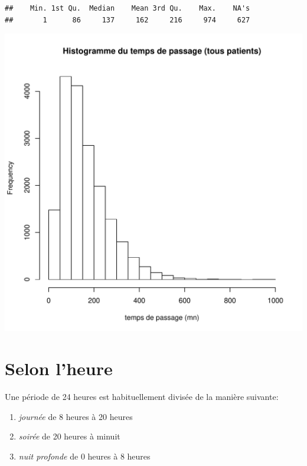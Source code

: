 \documentclass[12pt,english,french,twoside]{report}\usepackage[]{graphicx}\usepackage[]{color}
\makeatletter
\def\maxwidth{ %
  \ifdim\Gin@nat@width>\linewidth
    \linewidth
  \else
    \Gin@nat@width
  \fi
}
\newenvironment{kframe}{%
 \def\at@end@of@kframe{}%
 \ifinner\ifhmode%
  \def\at@end@of@kframe{\end{minipage}}%
  \begin{minipage}{\columnwidth}%
 \fi\fi%
 \def\FrameCommand##1{\hskip\@totalleftmargin \hskip-\fboxsep
 \colorbox{shadecolor}{##1}\hskip-\fboxsep
     \hskip-\linewidth \hskip-\@totalleftmargin \hskip\columnwidth}%
 \MakeFramed {\advance\hsize-\width
   \@totalleftmargin\z@ \linewidth\hsize
   \@setminipage}}%
 {\par\unskip\endMakeFramed%
 \at@end@of@kframe}
\newenvironment{knitrout}{}{} %
\makeatother
\begin{document}
\begin{knitrout}
\color{fgcolor}\begin{kframe}


{\ttfamily\noindent\color{warningcolor}{\#\# Warning: All formats failed to parse. No formats found.}}\begin{verbatim}
##    Min. 1st Qu.  Median    Mean 3rd Qu.    Max.    NA's 
##       1      86     137     162     216     974     627
\end{verbatim}
\end{kframe}
\includegraphics[width=\maxwidth]{figure/passage} 

\end{knitrout}



\section*{Selon l'heure}

Une période de 24 heures est habituellement divisée de la manière suivante:
\begin{enumerate}
  \item \emph{journée} de 8 heures à 20 heures
  \item \emph{soirée} de 20 heures à minuit
  \item  \emph{nuit profonde} de 0 heures à 8 heures
\end{enumerate}
\end{document}
